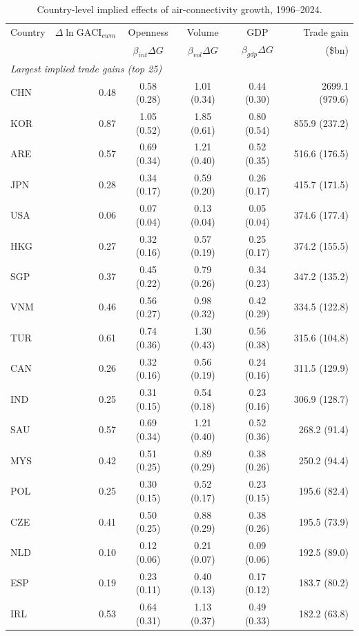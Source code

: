 \begin{table}[H]
\centering
\caption{Country-level implied effects of air-connectivity growth, 1996--2024.}
\label{tab:country}
\begin{threeparttable}
\scriptsize
\begin{tabular}{lrcccr}
\toprule
Country & $\Delta\ln\mathrm{GACI}_{cwm}$ & Openness & Volume & GDP & Trade gain \\
 & & $\beta_{int}\Delta G$ & $\beta_{vol}\Delta G$ & $\beta_{gdp}\Delta G$ & (\$bn) \\
\midrule
\multicolumn{6}{l}{\emph{Largest implied trade gains (top 25)}}\\
CHN & 0.48 & 0.58 (0.28) & 1.01 (0.34) & 0.44 (0.30) & 2699.1 (979.6) \\
KOR & 0.87 & 1.05 (0.52) & 1.85 (0.61) & 0.80 (0.54) & 855.9 (237.2) \\
ARE & 0.57 & 0.69 (0.34) & 1.21 (0.40) & 0.52 (0.35) & 516.6 (176.5) \\
JPN & 0.28 & 0.34 (0.17) & 0.59 (0.20) & 0.26 (0.17) & 415.7 (171.5) \\
USA & 0.06 & 0.07 (0.04) & 0.13 (0.04) & 0.05 (0.04) & 374.6 (177.4) \\
HKG & 0.27 & 0.32 (0.16) & 0.57 (0.19) & 0.25 (0.17) & 374.2 (155.5) \\
SGP & 0.37 & 0.45 (0.22) & 0.79 (0.26) & 0.34 (0.23) & 347.2 (135.2) \\
VNM & 0.46 & 0.56 (0.27) & 0.98 (0.32) & 0.42 (0.29) & 334.5 (122.8) \\
TUR & 0.61 & 0.74 (0.36) & 1.30 (0.43) & 0.56 (0.38) & 315.6 (104.8) \\
CAN & 0.26 & 0.32 (0.16) & 0.56 (0.19) & 0.24 (0.16) & 311.5 (129.9) \\
IND & 0.25 & 0.31 (0.15) & 0.54 (0.18) & 0.23 (0.16) & 306.9 (128.7) \\
SAU & 0.57 & 0.69 (0.34) & 1.21 (0.40) & 0.52 (0.36) & 268.2 (91.4) \\
MYS & 0.42 & 0.51 (0.25) & 0.89 (0.29) & 0.38 (0.26) & 250.2 (94.4) \\
POL & 0.25 & 0.30 (0.15) & 0.52 (0.17) & 0.23 (0.15) & 195.6 (82.4) \\
CZE & 0.41 & 0.50 (0.25) & 0.88 (0.29) & 0.38 (0.26) & 195.5 (73.9) \\
NLD & 0.10 & 0.12 (0.06) & 0.21 (0.07) & 0.09 (0.06) & 192.5 (89.0) \\
ESP & 0.19 & 0.23 (0.11) & 0.40 (0.13) & 0.17 (0.12) & 183.7 (80.2) \\
IRL & 0.53 & 0.64 (0.31) & 1.13 (0.37) & 0.49 (0.33) & 182.2 (63.8) \\

\end{tabular}
\end{threeparttable}
\end{table}
